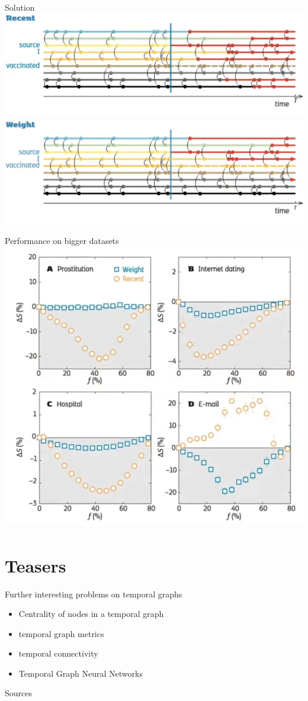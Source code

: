 \documentclass{beamer}
\begin{document}
\begin{frame}{Solution}
  \includegraphics[width=\linewidth]{media/solution_recent.png}
  \includegraphics[width=\linewidth]{media/solution_weight.png} 
\end{frame}

\begin{frame}{Performance on bigger datasets}
  \centering
  \includegraphics[width=0.6\linewidth]{media/performance_protocols.png}
  \cite{Lee_2012}
\end{frame}

\section{Teasers}
\begin{frame}{Further interesting problems on temporal graphs}
  \begin{itemize}
    \item Centrality of nodes in a temporal graph
    \item temporal graph metrics
    \item temporal connectivity
    \item Temporal Graph Neural Networks
  \end{itemize}
\end{frame}

\begin{frame}[allowframebreaks]{Sources}
\end{frame}
\end{document}
